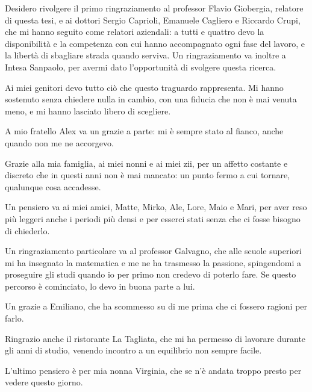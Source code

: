 \documentclass[twoside,greek]{toptesi}
\begin{document}
\ringraziamenti%
\begingroup
\setlength{\parskip}{0.75\baselineskip}
\setlength{\parindent}{0pt}

Desidero rivolgere il primo ringraziamento al professor Flavio Giobergia, relatore di questa tesi, e ai dottori Sergio Caprioli, Emanuele Cagliero e Riccardo Crupi, che mi hanno seguito come relatori aziendali: a tutti e quattro devo la disponibilità e la competenza con cui hanno accompagnato ogni fase del lavoro, e la libertà di sbagliare strada quando serviva. Un ringraziamento va inoltre a Intesa Sanpaolo, per avermi dato l'opportunità di svolgere questa ricerca.

Ai miei genitori devo tutto ciò che questo traguardo rappresenta. Mi hanno sostenuto senza chiedere nulla in cambio, con una fiducia che non è mai venuta meno, e mi hanno lasciato libero di scegliere.

A mio fratello Alex va un grazie a parte: mi è sempre stato al fianco, anche quando non me ne accorgevo.

Grazie alla mia famiglia, ai miei nonni e ai miei zii, per un affetto costante e discreto che in questi anni non è mai mancato: un punto fermo a cui tornare, qualunque cosa accadesse.

Un pensiero va ai miei amici, Matte, Mirko, Ale, Lore, Maio e Mari, per aver reso più leggeri anche i periodi più densi e per esserci stati senza che ci fosse bisogno di chiederlo.

Un ringraziamento particolare va al professor Galvagno, che alle scuole superiori mi ha insegnato la matematica e me ne ha trasmesso la passione, spingendomi a proseguire gli studi quando io per primo non credevo di poterlo fare. Se questo percorso è cominciato, lo devo in buona parte a lui.

Un grazie a Emiliano, che ha scommesso su di me prima che ci fossero ragioni per farlo.

Ringrazio anche il ristorante La Tagliata, che mi ha permesso di lavorare durante gli anni di studio, venendo incontro a un equilibrio non sempre facile.

L'ultimo pensiero è per mia nonna Virginia, che se n'è andata troppo presto per vedere questo giorno.
\par\endgroup

\end{document}
